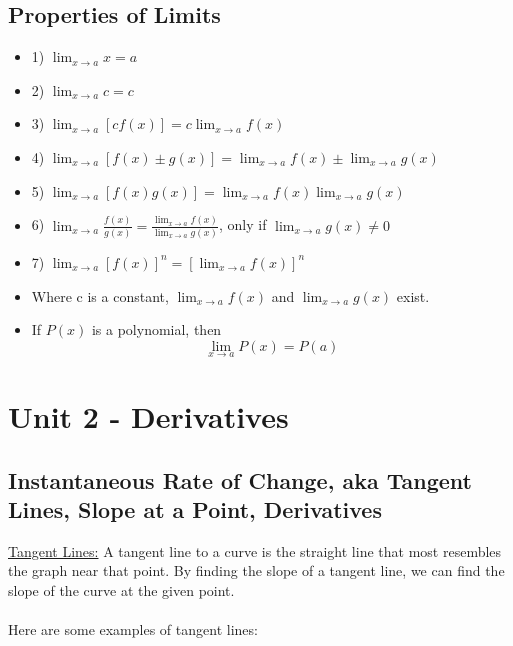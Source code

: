 \documentclass{article}
\begin{document}
\subsection{Properties of Limits}
\begin{itemize}
\item 1) $\lim _{x \rightarrow a} x=a$ \\
\item 2) $\lim _{x \rightarrow a} c=c$ \\
\item 3) $\lim _{x \rightarrow a}[c f(x)]=c \lim _{x \rightarrow a} f(x)$ \\
\item 4) $\lim _{x \rightarrow a}[f(x) \pm g(x)]=\lim _{x \rightarrow a} f(x) \pm \lim _{x \rightarrow a} g(x)$\\
\item 5) $\lim _{x \rightarrow a}[f(x) g(x)]=\lim _{x \rightarrow a} f(x) \lim _{x \rightarrow a} g(x)$\\
\item 6) $\lim _{x \rightarrow a} \frac{f(x)}{g(x)}=\frac{\lim _{x \rightarrow a} f(x)}{\lim _{x \rightarrow a} g(x)}$, only if $\lim _{x \rightarrow a} g(x) \neq 0$\\
\item 7) $\lim _{x \rightarrow a}[f(x)]^n=\left[\lim _{x \rightarrow a} f(x)\right]^n$\\

\item Where $\mathrm{c}$ is a constant, $\lim _{x \rightarrow a} f(x)$ and $\lim _{x \rightarrow a} g(x)$ exist.\\

\item If $P(x)$ is a polynomial, then
$$\lim _{x \rightarrow a} P(x)=P(a)$$
\end{itemize}
\newpage
\section{Unit 2 - Derivatives}
\subsection{Instantaneous Rate of Change, aka Tangent Lines, Slope at a Point, Derivatives}
\underline{Tangent Lines:} A tangent line to a curve is the straight line that most resembles the graph near that point.  By finding the slope of a tangent line, we can find the slope of the curve at the given point. \\ \\ 
Here are some examples of tangent lines:
\end{document}
